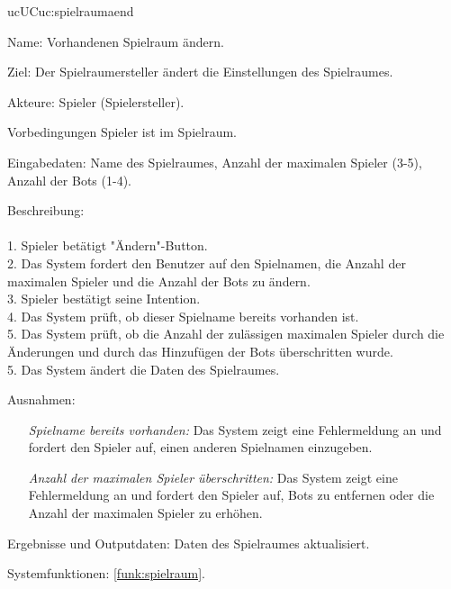 \begin{description}[leftmargin=5em, style=sameline]
	\begin{lhp}{uc}{UC}{uc:spielraumaend}
		\item [Name:] Vorhandenen Spielraum ändern.
		\item [Ziel:] Der Spielraumersteller ändert die Einstellungen des Spielraumes.
		\item [Akteure:] Spieler (Spielersteller).
		\item [Vorbedingungen] Spieler ist im Spielraum.
		\item [Eingabedaten:] Name des Spielraumes, Anzahl der maximalen Spieler (3-5), Anzahl der Bots (1-4).
		\item [Beschreibung:] \hfill\\ \hfill\\
			1. Spieler betätigt "{}Ändern{}"{}-Button.\\
			2. Das System fordert den Benutzer auf den Spielnamen, die Anzahl der maximalen Spieler und die Anzahl der Bots zu ändern. \\
			3. Spieler bestätigt seine Intention.\\
			4. Das System prüft, ob dieser Spielname bereits vorhanden ist.\\	
			5. Das System prüft, ob die Anzahl der zulässigen maximalen Spieler durch die Änderungen und durch das Hinzufügen der Bots überschritten wurde.\\	
			5. Das System ändert die Daten des Spielraumes.\\
		\item [Ausnahmen:] \hfill
			\begin{itemize} 
				\item[] \textit{Spielname bereits vorhanden:} Das System zeigt eine Fehlermeldung an und fordert den Spieler auf, einen anderen Spielnamen einzugeben.
				\item[] \textit{Anzahl der maximalen Spieler überschritten:} Das System zeigt eine Fehlermeldung an und fordert den Spieler auf, Bots zu entfernen oder die Anzahl der maximalen Spieler zu erhöhen.
				
			\end{itemize}
		\item [Ergebnisse und Outputdaten:] Daten des Spielraumes aktualisiert.   	
		\item [Systemfunktionen:] \ref{funk:spielraum}.
	\end{lhp}


\end{description}
